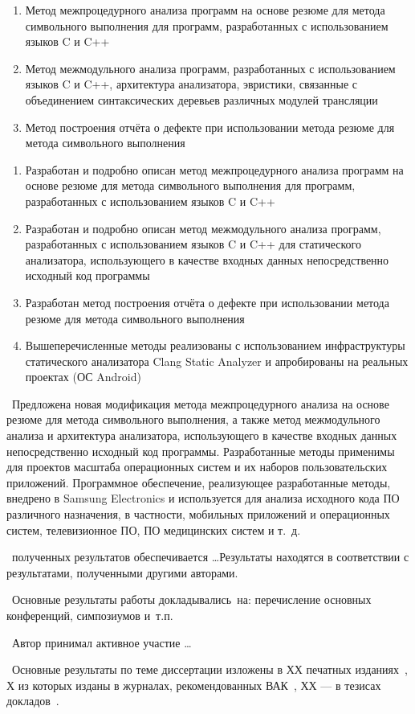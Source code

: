 \begin{enumerate}
  \item Метод межпроцедурного анализа программ на основе резюме для метода символьного выполнения для программ, разработанных с использованием языков C и C++
  \item Метод межмодульного анализа программ, разработанных с использованием языков C и C++, архитектура анализатора, эвристики, связанные с объединением синтаксических деревьев различных модулей трансляции
  \item Метод построения отчёта о дефекте при использовании метода резюме для метода символьного выполнения
\end{enumerate}

\novelty
\begin{enumerate}
  \item Разработан и подробно описан метод межпроцедурного анализа программ на основе резюме для метода символьного выполнения для программ, разработанных с использованием языков C и C++
  \item Разработан и подробно описан метод межмодульного анализа программ, разработанных с использованием языков C и C++ для статического анализатора, использующего в качестве входных данных непосредственно исходный код программы
  \item Разработан метод построения отчёта о дефекте при использовании метода резюме для метода символьного выполнения
  \item Вышеперечисленные методы реализованы с использованием инфраструктуры статического анализатора Clang Static Analyzer и апробированы на реальных проектах (ОС Android)
\end{enumerate}

\influence\ Предложена новая модификация метода межпроцедурного анализа на основе резюме для метода символьного выполнения, а также метод межмодульного анализа и архитектура анализатора, использующего в качестве входных данных непосредственно исходный код программы. Разработанные методы применимы для проектов масштаба операционных систем и их наборов пользовательских приложений. Программное обеспечение, реализующее разработанные методы, внедрено в Samsung Electronics и используется для анализа исходного кода ПО различного назначения, в частности, мобильных приложений и операционных систем, телевизионное ПО, ПО медицинских систем и т.~д.

\reliability\ полученных результатов обеспечивается \ldots Результаты находятся в соответствии с результатами, полученными другими авторами.

\probation\
Основные результаты работы докладывались~на:
перечисление основных конференций, симпозиумов и~т.\:п.

\contribution\ Автор принимал активное участие \ldots

\publications\ Основные результаты по теме диссертации изложены в ХХ печатных изданиях~\cite{summary-impl-mine,summary-intro-mine,summary-inter-unit-mine},
Х из которых изданы в журналах, рекомендованных ВАК~\cite{summary-impl-mine,summary-intro-mine,summary-inter-unit-mine}, 
ХХ --- в тезисах докладов~\cite{Lermontov,Management}.
